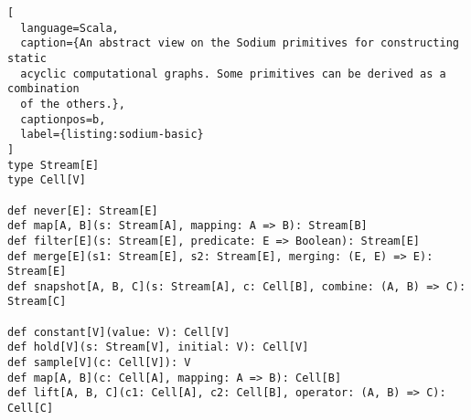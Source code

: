 \begin{lstlisting}[
  language=Scala,
  caption={An abstract view on the Sodium primitives for constructing static
  acyclic computational graphs. Some primitives can be derived as a combination
  of the others.},
  captionpos=b,
  label={listing:sodium-basic}
]
type Stream[E]
type Cell[V]

def never[E]: Stream[E]
def map[A, B](s: Stream[A], mapping: A => B): Stream[B]
def filter[E](s: Stream[E], predicate: E => Boolean): Stream[E]
def merge[E](s1: Stream[E], s2: Stream[E], merging: (E, E) => E): Stream[E]
def snapshot[A, B, C](s: Stream[A], c: Cell[B], combine: (A, B) => C): Stream[C]

def constant[V](value: V): Cell[V]
def hold[V](s: Stream[V], initial: V): Cell[V]
def sample[V](c: Cell[V]): V
def map[A, B](c: Cell[A], mapping: A => B): Cell[B]
def lift[A, B, C](c1: Cell[A], c2: Cell[B], operator: (A, B) => C): Cell[C]
\end{lstlisting}

